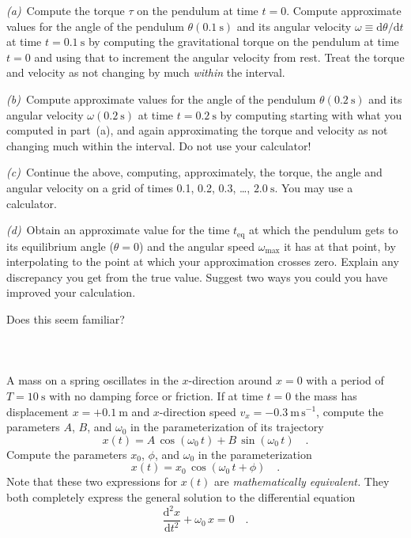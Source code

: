 \documentclass[12pt]{article}
\newcounter{problem}
\begin{document}
\textsl{(a)}~Compute the torque $\tau$ on the pendulum at time $t=0$.
Compute approximate values for the angle of the pendulum $\theta
(0.1~\mathrm{s})$ and its angular velocity
$\omega\equiv\mathrm{d}\theta/\mathrm{d}t$ at time $t=0.1~\mathrm{s}$
by computing the gravitational torque on the pendulum at time $t=0$
and using that to increment the angular velocity from rest.  Treat the
torque and velocity as not changing by much \emph{within} the
interval.

\textsl{(b)}~Compute approximate values for the angle of the pendulum
$\theta (0.2~\mathrm{s})$ and its angular velocity $\omega
(0.2~\mathrm{s})$ at time $t=0.2~\mathrm{s}$ by computing starting
with what you computed in part~(a), and again approximating the torque
and velocity as not changing much within the interval.  Do not use
your calculator!

\textsl{(c)}~Continue the above, computing, approximately, the torque,
the angle and angular velocity on a grid of times 0.1, 0.2, 0.3,
\ldots, $2.0~\mathrm{s}$.  You may use a calculator.

\textsl{(d)}~Obtain an approximate value for the time $t_\mathrm{eq}$
at which the pendulum gets to its equilibrium angle ($\theta=0$) and
the angular speed $\omega_\mathrm{max}$ it has at that point, by
interpolating to the point at which your approximation crosses zero.
Explain any discrepancy you get from the true value.  Suggest two ways
you could you have improved your calculation.

Does this seem familiar?

\paragraph{\problemname~\theproblem}

A mass on a spring oscillates in the $x$-direction around $x=0$ with a
period of $T=10~\mathrm{s}$ with no damping force or friction.  If at
time $t=0$ the mass has displacement $x=+0.1~\mathrm{m}$ and
$x$-direction speed $v_x=-0.3~\mathrm{m\,s^{-1}}$, compute the
parameters $A$, $B$, and $\omega_0$ in the parameterization of its
trajectory
\begin{equation}
x(t) = A\,\cos(\omega_0\,t) + B\,\sin(\omega_0\,t) \quad .
\end{equation}
Compute the parameters $x_0$, $\phi$, and $\omega_0$ in the
parameterization
\begin{equation}
x(t) = x_0\,\cos (\omega_0\,t+\phi) \quad .
\end{equation}
Note that these two expressions for $x(t)$ are \emph{mathematically
equivalent.}  They both completely express the general solution to the
differential equation
\begin{equation}
\frac{\mathrm{d}^2x}{\mathrm{d}t^2}+\omega_0\,x=0 \quad .
\end{equation}
\end{document}
